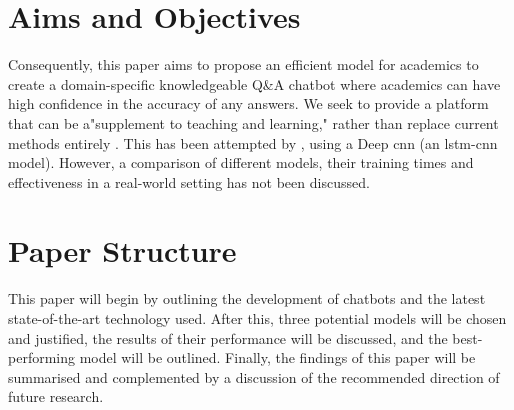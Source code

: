 \section{Aims and Objectives} %
\label{sec:intro_aims_and_objectives}

Consequently, this paper aims to propose an efficient model for academics to create a domain-specific knowledgeable Q\&A chatbot where academics can have high confidence in the accuracy of any answers. We seek to provide a platform that can be a"supplement to teaching and learning," rather than replace current methods entirely \citep{Nee2023ExploringTT}. This has been attempted by \citep{Chen22}, using a Deep \acrlong{cnn} (an \acrshort{lstm}-\acrshort{cnn} model). However, a comparison of different models, their training times and effectiveness in a real-world setting has not been discussed.


\section{Paper Structure}
\label{sec:intro_paper_structure}

This paper will begin by outlining the development of chatbots and the latest state-of-the-art technology used. After this, three potential models will be chosen and justified, the results of their performance will be discussed, and the best-performing model will be outlined. Finally, the findings of this paper will be summarised and complemented by a discussion of the recommended direction of future research. %